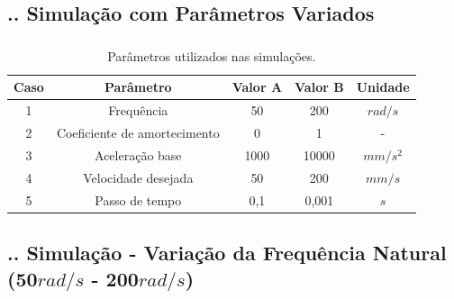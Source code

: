 \documentclass[aspectratio=169]{beamer}
\begin{document}
\subsection{\insertsectionnumber .\insertsubsectionnumber . Simulação com Parâmetros Variados}
\begin{frame}
  \frametitle{\insertsubsection}
  \begin{table}
    \begin{center}
    \caption{Parâmetros utilizados nas simulações.}
    \label{tab:sim_params}
    \begin{tabular}{c c c c c}
        Caso & Parâmetro & Valor A & Valor B & Unidade\\ \hline
        1 & Frequência & 50 & 200 & $rad/s$\\
        2 & Coeficiente de amortecimento & 0 & 1 & - \\
        3 & Aceleração base & 1000 & 10000 & $mm/s^2$ \\
        4 & Velocidade desejada & 50 & 200 & $mm/s$ \\
        5 & Passo de tempo & 0,1 & 0,001 & $s$ \\ \hline
    \end{tabular}
    \end{center}
  \end{table}
\end{frame}

\subsection{\insertsectionnumber .\insertsubsectionnumber . Simulação - Variação da Frequência Natural (50$rad/s$ - 200$rad/s$)}
\end{document}
